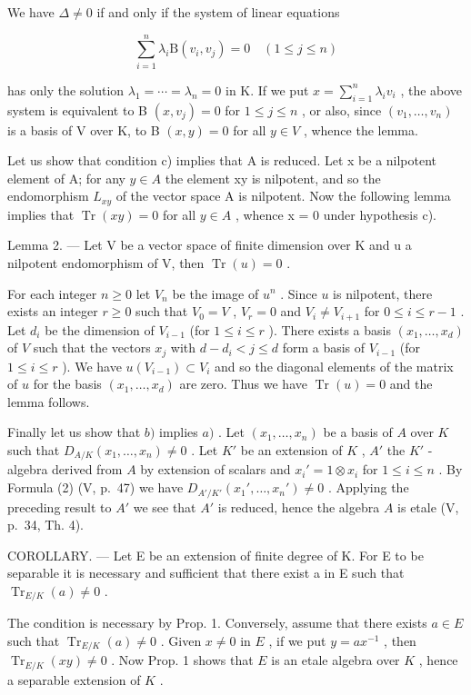 We have \(\Delta \neq 0\) if and only if the system of linear equations

\[
\sum_ {i = 1} ^ {n} \lambda_ {i} \mathrm{B} (v _ {i}, v _ {j}) = 0 \quad (1 \leqslant j \leqslant n)
\]

has only the solution \(\lambda_1 = \cdots = \lambda_n = 0\) in K. If we put \(x = \sum_{i=1}^{n} \lambda_i v_i\) , the above system is equivalent to B \((x, v_j) = 0\) for \(1 \leqslant j \leqslant n\) , or also, since \((v_1, \ldots, v_n)\) is a basis of V over K, to B \((x, y) = 0\) for all \(y \in V\) , whence the lemma.

Let us show that condition c) implies that A is reduced. Let x be a nilpotent element of A; for any \(y \in A\) the element xy is nilpotent, and so the endomorphism \(L_{xy}\) of the vector space A is nilpotent. Now the following lemma implies that \(\operatorname{Tr}(xy) = 0\) for all \(y \in A\) , whence x = 0 under hypothesis c).

Lemma 2. --- Let V be a vector space of finite dimension over K and u a nilpotent endomorphism of V, then \(\operatorname{Tr}(u)=0\) .

For each integer \(n \geqslant 0\) let \(V_n\) be the image of \(u^n\) . Since \(u\) is nilpotent, there exists an integer \(r \geqslant 0\) such that \(V_0 = V\) , \(V_r = 0\) and \(V_i \neq V_{i+1}\) for \(0 \leqslant i \leqslant r-1\) . Let \(d_i\) be the dimension of \(V_{i-1}\) (for \(1 \leqslant i \leqslant r\) ). There exists a basis \((x_1, \ldots, x_d)\) of \(V\) such that the vectors \(x_j\) with \(d - d_i < j \leqslant d\) form a basis of \(V_{i-1}\) (for \(1 \leqslant i \leqslant r\) ). We have \(u(V_{i-1}) \subset V_i\) and so the diagonal elements of the matrix of \(u\) for the basis \((x_1, \ldots, x_d)\) are zero. Thus we have \(\operatorname{Tr}(u) = 0\) and the lemma follows.

Finally let us show that \(b)\) implies \(a)\) . Let \((x_1, \ldots, x_n)\) be a basis of \(A\) over \(K\) such that \(D_{A/K}(x_1, \ldots, x_n) \neq 0\) . Let \(K'\) be an extension of \(K\) , \(A'\) the \(K'\) -algebra derived from \(A\) by extension of scalars and \(x_i' = 1 \otimes x_i\) for \(1 \leqslant i \leqslant n\) . By Formula (2) (V, p.~47) we have \(D_{A'/K'}(x_1', \ldots, x_n') \neq 0\) . Applying the preceding result to \(A'\) we see that \(A'\) is reduced, hence the algebra \(A\) is etale (V, p.~34, Th. 4).

COROLLARY. --- Let E be an extension of finite degree of K. For E to be separable it is necessary and sufficient that there exist a in E such that \(\operatorname{Tr}_{E/K}(a) \neq 0\) .

The condition is necessary by Prop. 1. Conversely, assume that there exists \(a \in E\) such that \(\operatorname{Tr}_{E/K}(a) \neq 0\) . Given \(x \neq 0\) in \(E\) , if we put \(y = ax^{-1}\) , then \(\operatorname{Tr}_{E/K}(xy) \neq 0\) . Now Prop. 1 shows that \(E\) is an etale algebra over \(K\) , hence a separable extension of \(K\) .

